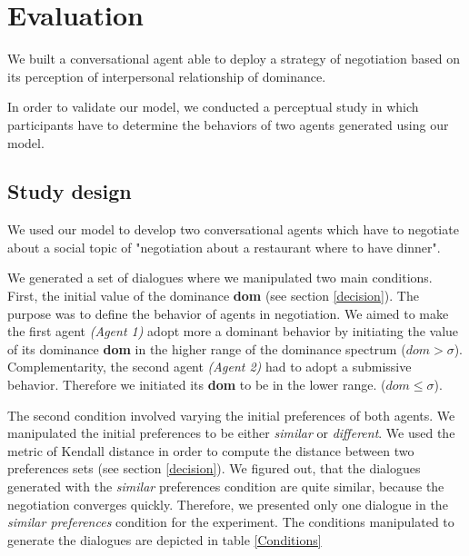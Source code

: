 \documentclass{llncs}
\begin{document}
			
						  
				\section{Evaluation}
				
				 We built a conversational agent able to deploy a strategy of negotiation based on its perception of interpersonal relationship of dominance. 
				 
				 In order to validate our model, we conducted a perceptual study in which participants have to determine the behaviors of two agents generated using our model. 
				 
					\subsection{Study design}
				We used our model to develop two conversational agents which have to negotiate about a social topic of "negotiation about a restaurant where to have dinner".
				
				We generated a set of dialogues where we manipulated two main conditions. First, the initial value of the dominance \textbf{dom} (see section \ref{decision}). The purpose was to define the behavior of agents in negotiation.
				We aimed to make the first agent \emph{(Agent 1)} adopt more a dominant behavior by initiating the value of its dominance \textbf{dom} in the higher range of the dominance spectrum ($dom>\sigma$). Complementarity, the second agent \emph{(Agent 2)} had to adopt a submissive behavior. Therefore we initiated its \textbf{dom} to be in the lower range. ($ dom\leq \sigma$).
				
				The second condition involved varying the initial preferences of both agents. We manipulated the initial preferences to be either \textit{similar} or \textit{different}. We used the metric of Kendall distance \cite{bra2013Kendall} in order to compute the distance between two preferences sets (see section \ref{decision}).  
				We figured out, that the dialogues generated with the \textit{similar} preferences condition are quite similar, because the negotiation converges quickly. Therefore, we presented only one dialogue in the \textit{similar preferences} condition for the experiment. 
				The conditions manipulated to generate the dialogues are depicted in table \ref{Conditions}
				
\end{document}
